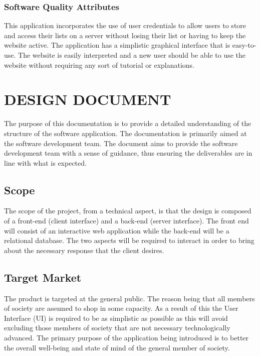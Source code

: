 \documentclass[10pt,twocolumn]{witseiepaper}
\begin{document}
		\subsubsection{Software Quality Attributes}
		
		This application incorporates the use of user credentials to allow users to store and access their lists on a 	server without losing their list or having to keep the website active. The application has a simplistic graphical interface that is easy-to-use. The website is easily interpreted and a new user should be able to use the website without requiring any sort of tutorial or explanations.

\section{DESIGN DOCUMENT}

	The purpose of this documentation is to provide a detailed understanding of the structure of the software application. The documentation is primarily aimed at the software development team. The document aims to provide the software development team with a sense of guidance, thus ensuring the deliverables are in line with what is expected.
	
	\subsection{Scope}
	
		The scope of the project, from a technical aspect, is that the design is composed of a front-end (client interface) and a back-end (server interface). The front end will consist of an interactive web application while the back-end will be a relational database. The two aspects will be required to interact in order to bring about the necessary response that the client desires. 

	\subsection{Target Market}
	
		The product is targeted at the general public. The reason being that all members of society are assumed to shop in some capacity. As a result of this the User Interface (UI) is required to be as simplistic as possible as this will avoid excluding those members of society that are not necessary technologically advanced. The primary purpose of the application being introduced is to better the overall well-being and state of mind of the general member of society. 
		
\end{document}
